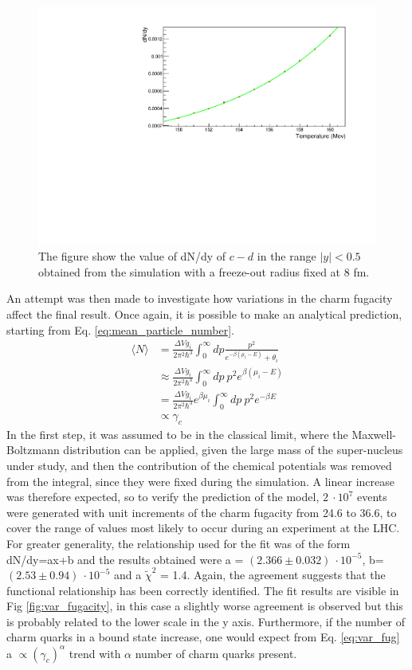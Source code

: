 \documentclass[12pt,a4paper]{book}
\begin{document}
		\begin{figure}
			\centering
		\includegraphics[width=0.8 \linewidth]{pictures/var_temperaure.pdf}
		\caption{The figure show the value of dN/dy of $c-d$ in the range $|y|<0.5$ obtained from the simulation with a freeze-out radius fixed at 8 fm. }
		\label{fig:var_temperature}
	\end{figure}
		An attempt was then made to investigate how variations in the charm fugacity affect the final result. Once again, it is possible to make an analytical prediction, starting from Eq. \ref{eq:mean_particle_number}.
\begin{equation}
	\begin{aligned}
		\langle N \rangle &= \frac{\Delta V g_i}{2\pi^2\hbar^3} 
		\int_{0}^{\infty} dp 
		\frac{p^2}{e^{-\beta(\mu_i-E)}+\theta_i} \\
		&\approx \frac{\Delta V g_i}{2\pi^2\hbar^3} 
		\int_{0}^{\infty} dp \ p^2 e^{\beta(\mu_i-E)} \\
		&= \frac{\Delta V g_i}{2\pi^2\hbar^3} e^{\beta \mu_i} 
		\int_{0}^{\infty} dp \ p^2 e^{-\beta E} \\
		&\propto \gamma_c
	\end{aligned}
	\label{eq:var_fug}
\end{equation} 
	In the first step, it was assumed to be in the classical limit, where the Maxwell-Boltzmann distribution can be applied, given the large mass of the super-nucleus under study, and then the contribution of the chemical potentials was removed from the integral, since they were fixed during the simulation. A linear increase was therefore expected, so to verify the prediction of the model, $2 \ \cdot 10^7$ events were generated with unit increments of the charm fugacity from 24.6 to 36.6, to cover the range of values most likely to occur during an experiment at the LHC. For greater generality, the relationship used for the fit was of the form dN/dy=ax+b and the results obtained were a = $(2.366 \pm 0.032)\ \cdot 10^{-5}$, b=$(2.53 \pm 0.94) \ \cdot 10^{-5}$ and a $\tilde{\chi}^2$ = 1.4. Again, the agreement suggests that the functional relationship has been correctly identified. The fit results are visible in Fig \ref{fig:var_fugacity}, in this case a slightly worse agreement is observed but this is probably related to the lower scale in the y axis. Furthermore, if the number of charm quarks in a bound state increase, one would expect from Eq. \ref{eq:var_fug} a $\propto(\gamma_c)^\alpha$ trend with $\alpha$ number of charm quarks present.
\end{document}
